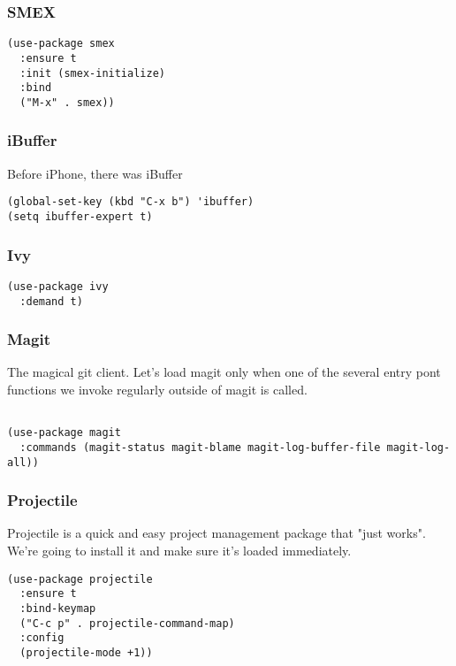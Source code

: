 \documentclass[11pt]{article}
\begin{document}
\subsubsection{SMEX}
\label{sec:orgb6ea74a}
\begin{verbatim}
(use-package smex
  :ensure t
  :init (smex-initialize)
  :bind 
  ("M-x" . smex))
\end{verbatim}

\subsubsection{iBuffer}
\label{sec:org53fcf99}
Before iPhone, there was iBuffer

\begin{verbatim}
(global-set-key (kbd "C-x b") 'ibuffer)
(setq ibuffer-expert t)
\end{verbatim}

\subsubsection{Ivy}
\label{sec:org65bfe0b}

\begin{verbatim}
(use-package ivy
  :demand t)
\end{verbatim}

\subsubsection{Magit}
\label{sec:org114df73}
The magical git client. Let's load magit only when one of the several entry pont
functions we invoke regularly outside of magit is called.

\begin{verbatim}

(use-package magit
  :commands (magit-status magit-blame magit-log-buffer-file magit-log-all))

\end{verbatim}

\subsubsection{Projectile}
\label{sec:orgb71e06b}
Projectile is a quick and easy project management package that "just works". We're
going to install it and make sure it's loaded immediately.

\begin{verbatim}
(use-package projectile
  :ensure t
  :bind-keymap
  ("C-c p" . projectile-command-map)
  :config
  (projectile-mode +1))
\end{verbatim}
\end{document}

